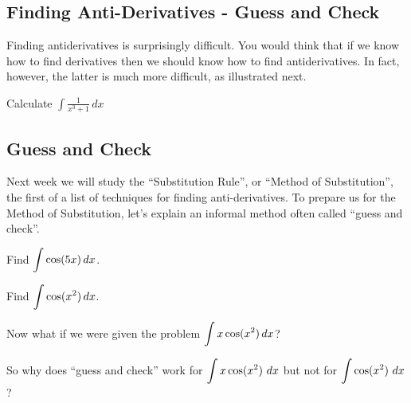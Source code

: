 \newpage
{}
\subsection*{Finding Anti-Derivatives - Guess and Check}
Finding antiderivatives is surprisingly difficult.  You would think
that if we know how to find derivatives then we should know how to
find antiderivatives.  In fact, however, the latter is much more
difficult, as illustrated next.

\newpage
\begin{problem}
	Calculate $\displaystyle \int \frac{1}{x^3+1}\, dx$
	
\end{problem}

\newpage
\subsection*{Guess and Check}{}
Next week we will study the ``Substitution Rule'', or ``Method of
Substitution'', the first of a list of techniques for finding
anti-derivatives. To prepare us for the Method of Substitution, let's
explain an informal method often called ``guess and check''.

\begin{problem}
	Find $\displaystyle \int \cos (5x)\,dx$.
	
\end{problem}

\newpage
\begin{problem}
	Find $\displaystyle \int \cos (x^2)\,dx$.
	
\end{problem}

\newpage

\begin{problem}
Now what if we were given the problem $\displaystyle \int x\cos (x^2)\,dx$?
\end{problem}


\vfill

So why does ``guess and check'' work for $\displaystyle \int x \cos(x^2)~dx$ but
not for $\displaystyle \int \cos(x^2)~dx$?
\vspace{1in}


